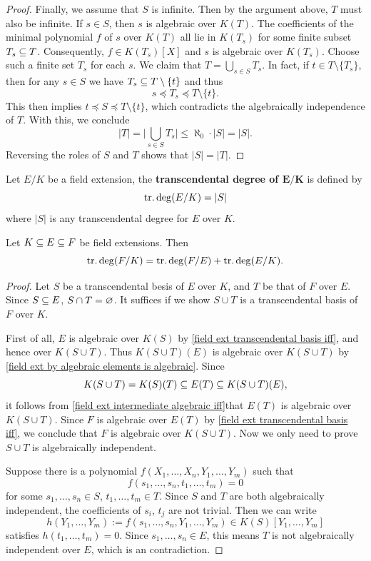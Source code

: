 \begin{proof}
Finally, we assume that $S$ is infinite. Then by the argument above, $T$ must also be infinite. If $s\in S$, then $s$ is algebraic over $K(T)$. The coefficients of the minimal polynomial $f$ of $s$ over $K(T)$ all lie in $K(T_s)$ for some finite subset $T_s\subseteq T$. Consequently, $f\in K(T_s)[X]$ and $s$ is algebraic over $K(T_s)$. Choose such a finite set $T_s$ for each $s$. We claim that $T=\bigcup_{s\in S}T_s$. In fact, if $t\in T\setminus\{T_s\}$, then for any $s\in S$ we have $T_s\subseteq T\setminus\{t\}$ and thus
\[s\preceq T_s\preceq T\setminus\{t\}.\]
This then implies $t\preceq S\preceq T\setminus\{t\}$, which contradicts the algebraically independence of $T$. With this, we conclude
\[|T|=\Big|\bigcup_{s\in S}T_s\Big|\leq\aleph_0\cdot|S|=|S|.\]
Reversing the roles of $S$ and $T$ shows that $|S|=|T|$.
\end{proof}
\begin{definition}
Let $E/K$ be a field extension, the \textbf{transcendental degree of $\bm{E/K}$} is defined by
\[\mathrm{tr}.\deg(E/K)=|S|\]
where $|S|$ is any transcendental degree for $E$ over $K$.
\end{definition}
\begin{proposition}\label{field transcendental degree additive}
Let $K\subseteq E\subseteq F$ be field extensions. Then
\[\mathrm{tr}.\deg(F/K)=\mathrm{tr}.\deg(F/E)+\mathrm{tr}.\deg(E/K).\]
\end{proposition}
\begin{proof}
Let $S$ be a transcendental besis of $E$ over $K$, and $T$ be that of $F$ over $E$. Since $S\subseteq E$, $S\cap T=\varnothing$. It suffices if we show $S\cup T$ is a transcendental basis of $F$ over $K$.\par
First of all, $E$ is algebraic over $K(S)$ by \cref{field ext transcendental basis iff}, and hence over $K(S\cup T)$. Thus $K(S\cup T)(E)$ is algebraic over $K(S\cup T)$ by \cref{field ext by algebraic elements is algebraic}. Since
\[K(S\cup T)=K(S)(T)\subseteq E(T)\subseteq K(S\cup T)(E),\]
it follows from \cref{field ext intermediate algebraic iff}that $E(T)$ is algebraic over $K(S\cup T)$. Since $F$ is algebraic over $E(T)$ by \cref{field ext transcendental basis iff}, we conclude that $F$ is algebraic over $K(S\cup T)$. Now we only need to prove $S\cup T$ is algebraically independent.\par
Suppose there is a polynomial $f(X_1,\dots,X_n,Y_1,\dots,Y_m)$ such that
\[f(s_1,\dots,s_n,t_1,\dots,t_m)=0\]
for some $s_1,\dots,s_n\in S$, $t_1,\dots,t_m\in T$. Since $S$ and $T$ are both algebraically independent, the coefficients of $s_i$, $t_j$ are not trivial. Then we can write
\[h(Y_1,\dots,Y_m):=f(s_1,\dots,s_n,Y_1,\dots,Y_m)\in K(S)[Y_1,\dots,Y_m]\]
satisfies $h(t_1,\dots,t_m)=0$. Since $s_1,\dots,s_n\in E$, this means $T$ is not algebraically independent over $E$, which is an contradiction.
\end{proof}
